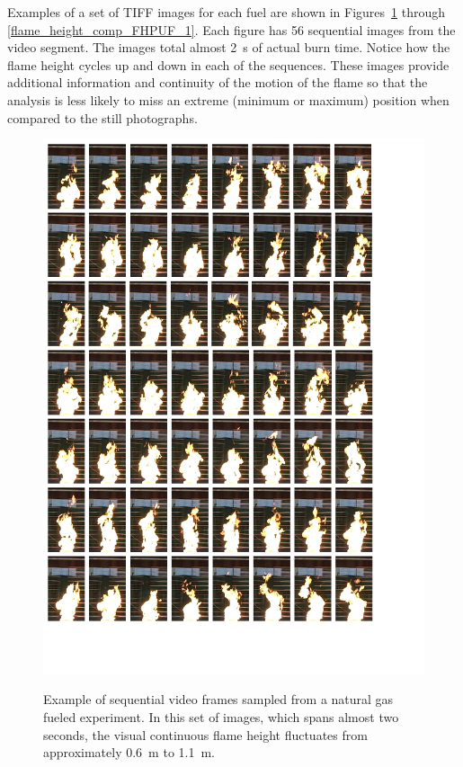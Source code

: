 \documentclass[twoside]{uocthesis}
\begin{document}
{Examples of a set of TIFF images for each fuel are shown in Figures~\ref{flame_height_comp_FHNG80_1} through \ref{flame_height_comp_FHPUF_1}.   Each figure has 56 sequential images from the video segment.  The images total almost 2~s of actual burn time.  Notice how the flame height cycles up and down in each of the sequences.  These images provide additional information and continuity of the motion of the flame so that the analysis is less likely to miss an extreme (minimum or maximum) position when compared to the still photographs.

\begin{figure}
	\centering
	\includegraphics[width=\textwidth]{../Figures/flame_height_comp_FHNG80}\\
	\caption[Example of sequential video frames sampled from a natural gas fueled experiment]{Example of sequential video frames sampled from a natural gas fueled experiment.  In this set of images, which spans almost two seconds, the visual continuous flame height fluctuates from approximately 0.6~m to 1.1~m.}
	\label{flame_height_comp_FHNG80_1}
\end{figure}

}
\end{document}
